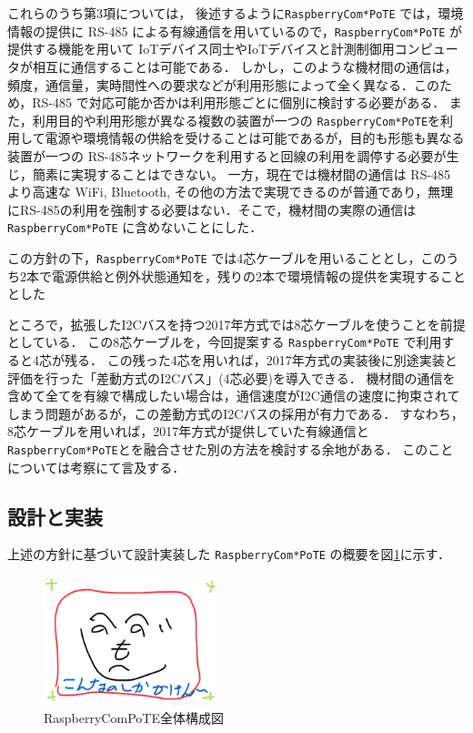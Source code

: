 
これらのうち第3項については，
後述するように{\tt Raspberry\-Com*PoTE} では，環境情報の提供に RS-485 による有線通信を用いているので，{\tt Raspberry\-Com*PoTE} が提供する機能を用いて IoTデバイス同士やIoTデバイスと計測制御用コンピュータが相互に通信することは可能である．
しかし，このような機材間の通信は，頻度，通信量，実時間性への要求などが利用形態によって全く異なる．このため，RS-485 で対応可能か否かは利用形態ごとに個別に検討する必要がある．
また，利用目的や利用形態が異なる複数の装置が一つの {\tt Raspberry\-Com*PoTE}を利用して電源や環境情報の供給を受けることは可能であるが，目的も形態も異なる装置が一つの RS-485ネットワークを利用すると回線の利用を調停する必要が生じ，簡素に実現することはできない。
一方，現在では機材間の通信は RS-485 より高速な WiFi, Bluetooth, その他の方法で実現できるのが普通であり，無理にRS-485の利用を強制する必要はない．そこで，機材間の実際の通信は {\tt Raspberry\-Com*PoTE} に含めないことにした．

この方針の下，{\tt Raspberry\-Com*PoTE} では4芯ケーブルを用いることとし，このうち2本で電源供給と例外状態通知を，残りの2本で環境情報の提供を実現することとした

ところで，拡張したI2Cバスを持つ2017年方式では8芯ケーブルを使うことを前提としている．
この8芯ケーブルを，今回提案する {\tt Raspberry\-Com*PoTE} で利用すると4芯が残る．
この残った4芯を用いれば，2017年方式の実装後に別途実装と評価を行った「差動方式のI2Cバス」(4芯必要)を導入できる．
機材間の通信を含めて全てを有線で構成したい場合は，通信速度がI2C通信の速度に拘束されてしまう問題があるが，この差動方式のI2Cバスの採用が有力である．
すなわち，8芯ケーブルを用いれば，2017年方式が提供していた有線通信と {\tt Raspberry\-Com*PoTE}とを融合させた別の方法を検討する余地がある．
このことについては考察にて言及する．



\subsection{設計と実装}
\vspace{-0.5zh}

上述の方針に基づいて設計実装した {\tt Raspberry\-Com*PoTE} の概要を図\ref{RaspberryComPoTE}に示す．

\vspace{-1zh}
\begin{figure}[H]
\centering
\includegraphics[width=5cm]{figspics/henoheno.jpeg}
\caption{{RaspberryComPoTE}全体構成図}
\label{RaspberryComPoTE}
\end{figure}
\vspace{-1zh}

